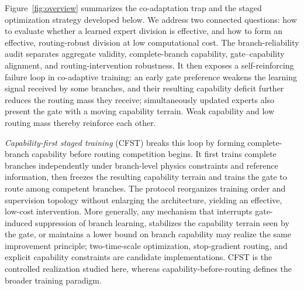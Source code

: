 \documentclass[preprint,12pt]{elsarticle}
\theoremstyle{remark}
\begin{document}
Figure~\ref{fig:overview} summarizes the co-adaptation trap and the staged optimization strategy developed below.
We address two connected questions: how to evaluate whether a learned expert division is effective, and how to form an effective, routing-robust division at low computational cost. The branch-reliability audit separates aggregate validity, complete-branch capability, gate--capability alignment, and routing-intervention robustness. It then exposes a self-reinforcing failure loop in co-adaptive training: an early gate preference weakens the learning signal received by some branches, and their resulting capability deficit further reduces the routing mass they receive; simultaneously updated experts also present the gate with a moving capability terrain. Weak capability and low routing mass thereby reinforce each other.

\emph{Capability-first staged training} (CFST) breaks this loop by forming complete-branch capability before routing competition begins. It first trains complete branches independently under branch-level physics constraints and reference information, then freezes the resulting capability terrain and trains the gate to route among competent branches. The protocol reorganizes training order and supervision topology without enlarging the architecture, yielding an effective, low-cost intervention. More generally, any mechanism that interrupts gate-induced suppression of branch learning, stabilizes the capability terrain seen by the gate, or maintains a lower bound on branch capability may realize the same improvement principle; two-time-scale optimization, stop-gradient routing, and explicit capability constraints are candidate implementations. CFST is the controlled realization studied here, whereas capability-before-routing defines the broader training paradigm.
\end{document}
